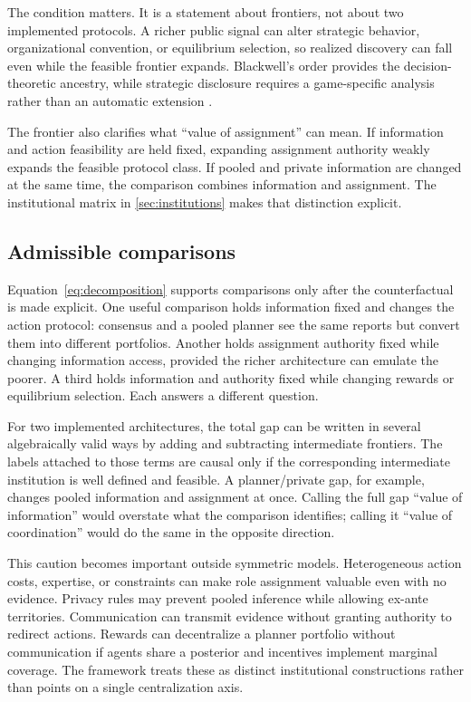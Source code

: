 \documentclass[11pt]{article}
\theoremstyle{remark}
\begin{document}
The condition matters. It is a statement about frontiers, not about two implemented protocols. A richer public signal can alter strategic behavior, organizational convention, or equilibrium selection, so realized discovery can fall even while the feasible frontier expands. Blackwell's order provides the decision-theoretic ancestry, while strategic disclosure requires a game-specific analysis rather than an automatic extension \citep{Blackwell1953,KamenicaGentzkow2011,AcemogluEtAl2018}.

The frontier also clarifies what ``value of assignment'' can mean. If information and action feasibility are held fixed, expanding assignment authority weakly expands the feasible protocol class. If pooled and private information are changed at the same time, the comparison combines information and assignment. The institutional matrix in \cref{sec:institutions} makes that distinction explicit.

\subsection*{Admissible comparisons}
Equation~\eqref{eq:decomposition} supports comparisons only after the counterfactual is made explicit. One useful comparison holds information fixed and changes the action protocol: consensus and a pooled planner see the same reports but convert them into different portfolios. Another holds assignment authority fixed while changing information access, provided the richer architecture can emulate the poorer. A third holds information and authority fixed while changing rewards or equilibrium selection. Each answers a different question.

For two implemented architectures, the total gap can be written in several algebraically valid ways by adding and subtracting intermediate frontiers. The labels attached to those terms are causal only if the corresponding intermediate institution is well defined and feasible. A planner/private gap, for example, changes pooled information and assignment at once. Calling the full gap ``value of information'' would overstate what the comparison identifies; calling it ``value of coordination'' would do the same in the opposite direction.

This caution becomes important outside symmetric models. Heterogeneous action costs, expertise, or constraints can make role assignment valuable even with no evidence. Privacy rules may prevent pooled inference while allowing ex-ante territories. Communication can transmit evidence without granting authority to redirect actions. Rewards can decentralize a planner portfolio without communication if agents share a posterior and incentives implement marginal coverage. The framework treats these as distinct institutional constructions rather than points on a single centralization axis.
\end{document}
